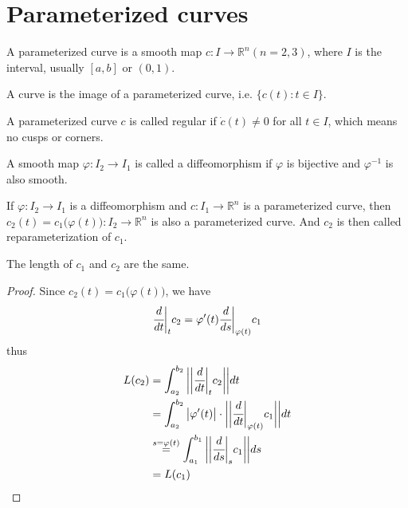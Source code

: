 \documentclass[10pt]{article}
\begin{document}
        \section{Parameterized curves}
            \begin{definition}
                A parameterized curve is a smooth map $c: I\rightarrow\mathbb{R}^n(n = 2, 3)$, where $I$ is the interval, usually $[a,b]$ or $(0,1)$.
            \end{definition}
            \begin{definition}[Curve]
                A curve is the image of a parameterized curve, i.e. $\{c(t): t\in I\}$.
            \end{definition}
            \begin{definition}
                A parameterized curve $c$ is called regular if $\dot{c}(t)\neq 0$ for all $t\in I$, which means no cusps or corners.
            \end{definition}
            \begin{definition}[Diffeomorphism]
                A smooth map $\varphi: I_2\rightarrow I_1$ is called a diffeomorphism if $\varphi$ is bijective and $\varphi^{-1}$ is also smooth.
            \end{definition}
            \begin{definition}[Reparameterization]
                If $\varphi: I_2\rightarrow I_1$ is a diffeomorphism and $c:I_1\rightarrow\mathbb{R}^n$ is a parameterized curve, then $c_2(t) = c_1\big(\varphi(t)\big): I_2\rightarrow\mathbb{R}^n$ is also a parameterized curve. And $c_2$ is then called reparameterization of $c_1$.
            \end{definition}
            \begin{lemma}
                The length of $c_1$ and $c_2$ are the same.
            \end{lemma}
            \begin{proof}
                Since $c_2(t) = c_1\big(\varphi(t)\big)$, we have
                \begin{equation*}
                    \begin{aligned}
                        \cfrac{d}{dt}\bigg|_t c_2 = \varphi'(t)\cfrac{d}{ds}\bigg|_{\varphi(t)}c_1
                    \end{aligned}
                \end{equation*}
                thus
                \begin{equation*}
                    \begin{aligned}
                        L(c_2) &= \int_{a_2}^{b_2}\bigg|\bigg|\cfrac{d}{dt}\bigg|_t c_2\bigg|\bigg|dt \\
                        &= \int_{a_2}^{b_2}\big|\varphi'(t)\big|\cdot\bigg|\bigg|\cfrac{d}{dt}\bigg|_{\varphi(t)}c_1\bigg|\bigg|dt \\
                        &\stackrel{s=\varphi(t)}{=}\int_{a_1}^{b_1}\bigg|\bigg|\cfrac{d}{ds}\bigg|_s c_1\bigg|\bigg|ds \\
                        &= L(c_1)
                    \end{aligned}
                \end{equation*}
            \end{proof}
\end{document}
